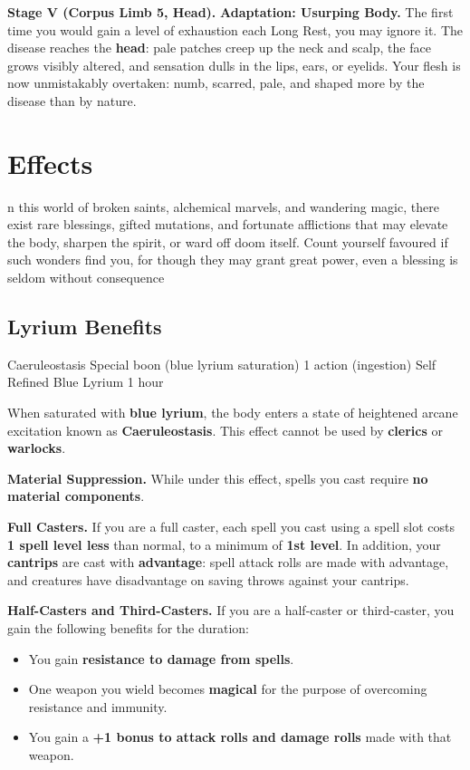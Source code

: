 \documentclass[letterpaper,twocolumn,openany,nodeprecatedcode,breakable,skins,xparse,most]{dndbook}
\begin{document}
\textbf{Stage V (Corpus Limb 5, Head).} \textbf{Adaptation: Usurping Body.} The first time you would gain a level of exhaustion each Long Rest, you may ignore it.
The disease reaches the \textbf{head}: pale patches creep up the neck and scalp, the face grows visibly altered, and sensation dulls in the lips, ears, or eyelids. Your flesh is now unmistakably overtaken: numb, scarred, pale, and shaped more by the disease than by nature.

\section{Effects}

n this world of broken saints, alchemical marvels, and wandering magic, there exist rare blessings, gifted mutations, and fortunate afflictions that may elevate the body, sharpen the spirit, or ward off doom itself. Count yourself favoured if such wonders find you, for though they may grant great power, even a blessing is seldom without consequence

\subsection{Lyrium Benefits}

\DndSpellHeader%
  {Caeruleostasis}
  {Special boon (blue lyrium saturation)}
  {1 action (ingestion)}
  {Self}
  {Refined Blue Lyrium}
  {1 hour}

When saturated with \textbf{blue lyrium}, the body enters a state of heightened arcane excitation known as \textbf{Caeruleostasis}. This effect cannot be used by \textbf{clerics} or \textbf{warlocks}.

\textbf{Material Suppression.}  
While under this effect, spells you cast require \textbf{no material components}.

\textbf{Full Casters.}  
If you are a full caster, each spell you cast using a spell slot costs \textbf{1 spell level less} than normal, to a minimum of \textbf{1st level}. In addition, your \textbf{cantrips} are cast with \textbf{advantage}: spell attack rolls are made with advantage, and creatures have disadvantage on saving throws against your cantrips.

\textbf{Half-Casters and Third-Casters.}  
If you are a half-caster or third-caster, you gain the following benefits for the duration:

\begin{itemize}
\item You gain \textbf{resistance to damage from spells}.
\item One weapon you wield becomes \textbf{magical} for the purpose of overcoming resistance and immunity.
\item You gain a \textbf{+1 bonus to attack rolls and damage rolls} made with that weapon.
\end{itemize}
\end{document}
